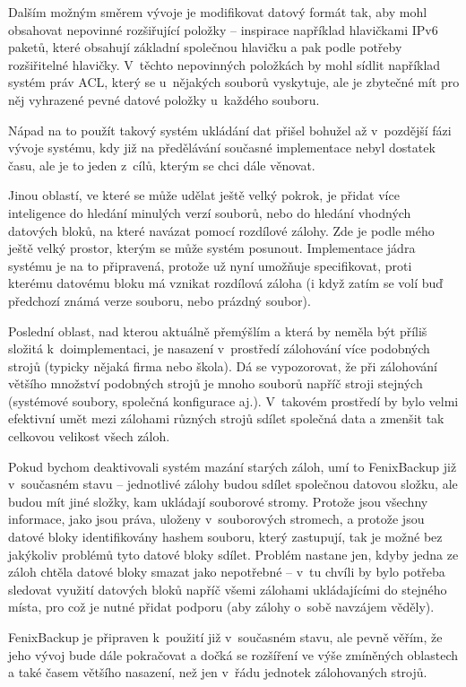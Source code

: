 
Dalším možným směrem vývoje je modifikovat datový formát tak, aby mohl obsahovat
nepovinné rozšiřující položky -- inspirace například hlavičkami IPv6 paketů,
které obsahují základní společnou hlavičku a pak podle potřeby rozšiřitelné
hlavičky. V~těchto nepovinných položkách by mohl sídlit například systém práv
\gls{ACL}, který se u~nějakých souborů vyskytuje, ale je zbytečné mít pro něj
vyhrazené pevné datové položky u~každého souboru.

Nápad na to použít takový systém ukládání dat přišel bohužel až v~pozdější fázi
vývoje systému, kdy již na předělávání současné implementace nebyl dostatek
času, ale je to jeden z~cílů, kterým se chci dále věnovat.

Jinou oblastí, ve které se může udělat ještě velký pokrok, je přidat více
inteligence do hledání minulých verzí souborů, nebo do hledání vhodných datových
bloků, na které navázat pomocí rozdílové zálohy. Zde je podle mého ještě velký
prostor, kterým se může systém posunout. Implementace jádra systému je na to
připravená, protože už nyní umožňuje specifikovat, proti kterému datovému bloku
má vznikat rozdílová záloha (i když zatím se volí buď předchozí známá verze
souboru, nebo prázdný soubor).

Poslední oblast, nad kterou aktuálně přemýšlím a která by neměla být příliš
složitá k~doimplementaci, je nasazení v~prostředí zálohování více podobných
strojů (typicky nějaká firma nebo škola). Dá se vypozorovat, že při zálohování
většího množství podobných strojů je mnoho souborů napříč stroji stejných
(systémové soubory, společná konfigurace aj.). V~takovém prostředí by bylo velmi
efektivní umět mezi zálohami různých strojů sdílet společná data a zmenšit tak
celkovou velikost všech záloh.

Pokud bychom deaktivovali systém mazání starých záloh, umí to FenixBackup již
v~současném stavu -- jednotlivé zálohy budou sdílet společnou datovou složku,
ale budou mít jiné složky, kam ukládají souborové stromy. Protože jsou všechny
informace, jako jsou práva, uloženy v~souborových stromech, a protože jsou
datové bloky identifikovány hashem souboru, který zastupují, tak je možné bez
jakýkoliv problémů tyto datové bloky sdílet. Problém nastane jen, kdyby jedna
ze záloh chtěla datové bloky smazat jako nepotřebné -- v~tu chvíli by bylo
potřeba sledovat využití datových bloků napříč všemi zálohami ukládajícími do
stejného místa, pro což je nutné přidat podporu (aby zálohy o~sobě navzájem
věděly).

FenixBackup je připraven k~použití již v~současném stavu, ale pevně věřím,
že jeho vývoj bude dále pokračovat a dočká se rozšíření ve výše zmíněných
oblastech a také časem většího nasazení, než jen v~řádu jednotek zálohovaných
strojů.
